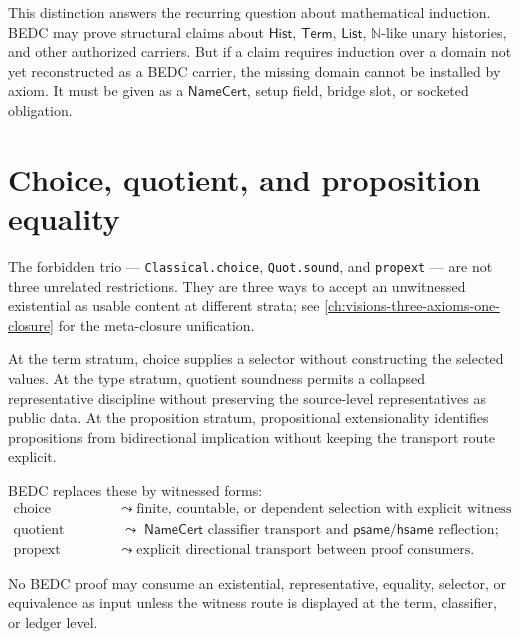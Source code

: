 This distinction answers the recurring question about mathematical induction. BEDC may prove structural claims about $\mathsf{Hist}$, $\mathsf{Term}$, $\mathsf{List}$, $\mathbb{N}$-like unary histories, and other authorized carriers. But if a claim requires induction over a domain not yet reconstructed as a BEDC carrier, the missing domain cannot be installed by axiom. It must be given as a $\mathsf{NameCert}$, setup field, bridge slot, or socketed obligation.

\section{Choice, quotient, and proposition equality}
\label{sec:external-supply-three-host-axioms}

The forbidden trio --- \texttt{Classical.choice}, \texttt{Quot.sound}, and \texttt{propext} --- are not three unrelated restrictions. They are three ways to accept an unwitnessed existential as usable content at different strata; see \autoref{ch:visions-three-axioms-one-closure} for the meta-closure unification.

At the term stratum, choice supplies a selector without constructing the selected values. At the type stratum, quotient soundness permits a collapsed representative discipline without preserving the source-level representatives as public data. At the proposition stratum, propositional extensionality identifies propositions from bidirectional implication without keeping the transport route explicit.

BEDC replaces these by witnessed forms:
$$
\begin{aligned}
\text{choice} &\;\leadsto\; \text{finite, countable, or dependent selection with explicit witness functions;} \\
\text{quotient soundness} &\;\leadsto\; \mathsf{NameCert}\text{ classifier transport and }\mathsf{psame}/\mathsf{hsame}\text{ reflection;} \\
\text{propext} &\;\leadsto\; \text{explicit directional transport between proof consumers.}
\end{aligned}
$$

\begin{principle}
\label{prin:external-supply-no-unwitnessed-existential}
No BEDC proof may consume an existential, representative, equality, selector, or equivalence as input unless the witness route is displayed at the term, classifier, or ledger level.
\end{principle}

